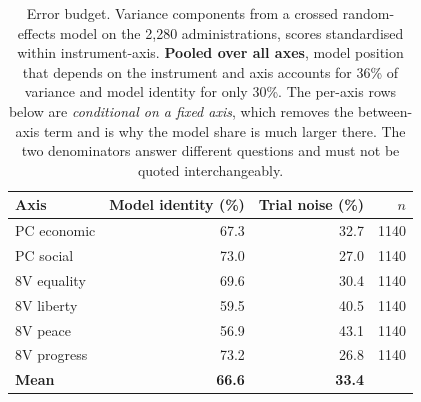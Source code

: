 \begin{table}[H]
\centering
\caption{Error budget. Variance components from a crossed random-effects model on the 2{,}280 administrations, scores standardised within instrument-axis. \textbf{Pooled over all axes}, model position that depends on the instrument and axis accounts for 36\% of variance and model identity for only 30\%. The per-axis rows below are \emph{conditional on a fixed axis}, which removes the between-axis term and is why the model share is much larger there. The two denominators answer different questions and must not be quoted interchangeably.}
\label{tab:error-budget}
\begin{tabular}{lrrr}
\toprule
Axis & Model identity (\%) & Trial noise (\%) & $n$ \\
\midrule
PC economic & 67.3 & 32.7 & 1140 \\
PC social & 73.0 & 27.0 & 1140 \\
8V equality & 69.6 & 30.4 & 1140 \\
8V liberty & 59.5 & 40.5 & 1140 \\
8V peace & 56.9 & 43.1 & 1140 \\
8V progress & 73.2 & 26.8 & 1140 \\
\midrule
\textbf{Mean} & \textbf{66.6} & \textbf{33.4} & \\
\bottomrule
\end{tabular}
\end{table}

